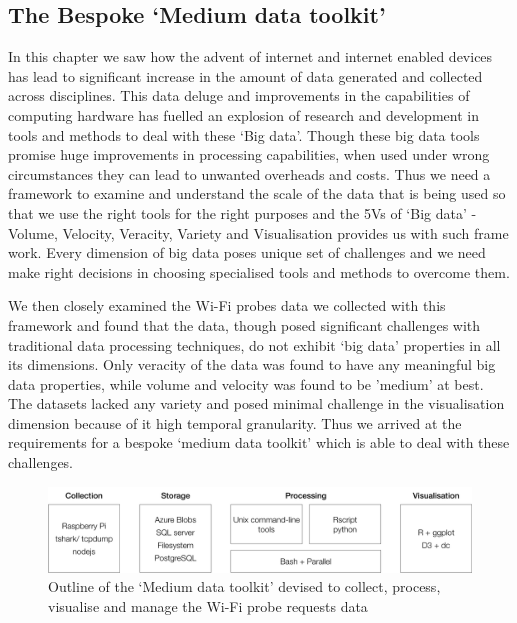 \subsection{The Bespoke `Medium data toolkit'}

In this chapter we saw how the advent of internet and internet enabled devices has lead to significant increase in the amount of data generated and collected across disciplines. 
This data deluge and improvements in the capabilities of computing hardware has fuelled an explosion of research and development in tools and methods to deal with these `Big data'.
Though these big data tools promise huge improvements in processing capabilities, when used under wrong circumstances they can lead to unwanted overheads and costs.
Thus we need a framework to examine and understand the scale of the data that is being used so that we use the right tools for the right purposes and the 5Vs of `Big data' - Volume, Velocity, Veracity, Variety and Visualisation provides us with such frame work.
Every dimension of big data poses unique set of challenges and we need make right decisions in choosing specialised tools and methods to overcome them.

We then closely examined the Wi-Fi probes data we collected with this framework and found that the data, though posed significant challenges with traditional data processing techniques, do not exhibit `big data' properties in all its dimensions. 
Only veracity of the data was found to have any meaningful big data properties, while volume and velocity was found to be 'medium' at best. 
The datasets lacked any variety and posed minimal challenge in the visualisation dimension because of it high temporal granularity.
Thus we arrived at the requirements for a bespoke `medium data toolkit' which is able to deal with these challenges.

\begin{figure}
  \includegraphics{images/toolkit.png}
  \caption{Outline of the `Medium data toolkit' devised to collect, process, visualise and manage the Wi-Fi probe requests data}
  \label{figure:toolkit}
\end{figure}


